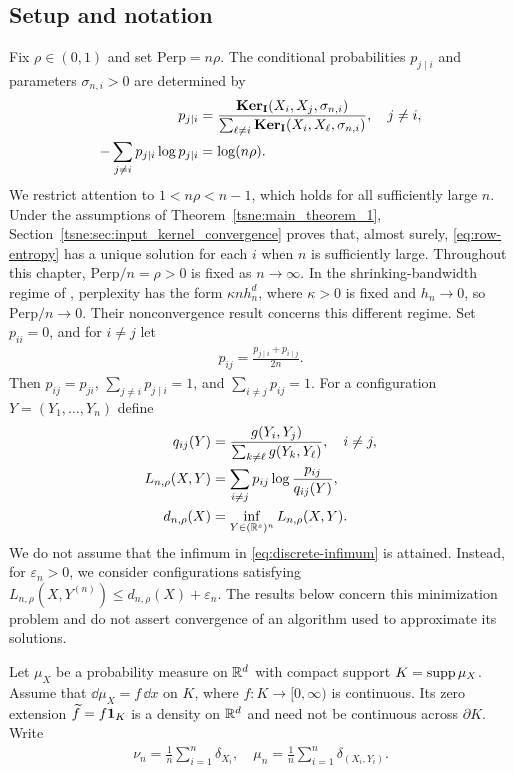 \subsection*{Setup and notation}\label{sec:setup}
Fix $\rho\in(0,1)$ and set $\mathrm{Perp}=n\rho$. The conditional probabilities $p_{j\mid i}$ and parameters $\sigma_{n,i}>0$ are determined by
\begin{align}\label{eq:conditional-input}
p_{j\mid i}&=\frac{\mathbf{Ker}_{\mathbf{I}}(X_i,X_j,\sigma_{n,i})}
{\sum_{\ell\ne i}\mathbf{Ker}_{\mathbf{I}}(X_i,X_\ell,\sigma_{n,i})},\quad j\ne i,\\
-\sum_{j\ne i}p_{j\mid i}\log p_{j\mid i}&=\log(n\rho).\label{eq:row-entropy}
\end{align}
We restrict attention to $1<n\rho<n-1$, which holds for all sufficiently large $n$. Under the assumptions of Theorem~\ref{tsne:main_theorem_1}, Section~\ref{tsne:sec:input_kernel_convergence} proves that, almost surely, \eqref{eq:row-entropy} has a unique solution for each $i$ when $n$ is sufficiently large. Throughout this chapter, $\mathrm{Perp}/n=\rho>0$ is fixed as $n\to\infty$. In the shrinking-bandwidth regime of \cite{murray2024largedatalimitsscaling}, perplexity has the form $\kappa n h_n^d$, where $\kappa>0$ is fixed and $h_n\to0$, so $\mathrm{Perp}/n\to0$. Their nonconvergence result concerns this different regime.
Set $p_{ii}=0$, and for $i\ne j$ let
\begin{align}\label{eq:symmetric-input}
p_{ij}=\frac{p_{j\mid i}+p_{i\mid j}}{2n}.
\end{align}
Then $p_{ij}=p_{ji}$, $\sum_{j\ne i}p_{j\mid i}=1$, and $\sum_{i\ne j}p_{ij}=1$. For a configuration $Y=(Y_1,\dots,Y_n)$ define
\begin{align}\label{eq:output-probabilities}
q_{ij}(Y)&=\frac{g(Y_i,Y_j)}{\sum_{k\ne\ell}g(Y_k,Y_\ell)},\quad i\ne j,\\
L_{n,\rho}(X,Y)&=\sum_{i\ne j}p_{ij}\log\frac{p_{ij}}{q_{ij}(Y)},\label{eq:discrete-objective}\\
d_{n,\rho}(X)&=\inf_{Y\in(\mathbb{R}^s)^n}L_{n,\rho}(X,Y).\label{eq:discrete-infimum}
\end{align}
We do not assume that the infimum in \eqref{eq:discrete-infimum} is attained. Instead, for $\varepsilon_n>0$, we consider configurations satisfying
$L_{n,\rho}(X,Y^{(n)})\leq d_{n,\rho}(X)+\varepsilon_n$.
The results below concern this minimization problem and do not assert convergence of an algorithm used to approximate its solutions.

Let $\mu_X$ be a probability measure on $\mathbb{R}^d$ with compact support $K=\operatorname{supp}\mu_X$. Assume that $\dd\mu_X=f\,\dd x$ on $K$, where $f:K\to[0,\infty)$ is continuous. Its zero extension $\widetilde f=f\mathbf 1_K$ is a density on $\mathbb{R}^d$ and need not be continuous across $\partial K$. Write
\begin{align}\label{eq:empirical-measures}
\nu_n=\frac1n\sum_{i=1}^n\delta_{X_i},\quad
\mu_n=\frac1n\sum_{i=1}^n\delta_{(X_i,Y_i)}.
\end{align}

